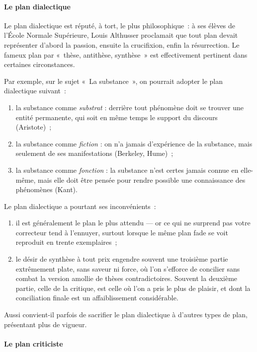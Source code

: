 \documentclass[a4paper]{article}
\begin{document}
\paragraph{Le plan dialectique}
\label{sec-2-4-2-1}


Le plan dialectique est réputé, à tort, le plus philosophique : à ses
élèves de l'École Normale Supérieure, Louis Althusser proclamait que
tout plan devait représenter d'abord la passion, ensuite la crucifixion,
enfin la résurrection. Le fameux plan par « thèse, antithèse, synthèse »
est effectivement pertinent dans certaines circonstances.

Par exemple, sur le sujet « La substance », on pourrait adopter le plan
dialectique suivant :

\begin{enumerate}
\item la substance comme \emph{substrat} : derrière tout phénomène doit se
   trouver une entité permanente, qui soit en même temps le support du
   discours (Aristote) ;
\item la substance comme \emph{fiction} : on n'a jamais d'expérience de la
   substance, mais seulement de ses manifestations (Berkeley, Hume) ;
\item la substance comme \emph{fonction} : la substance n'est certes jamais
   connue en elle-même, mais elle doit être pensée pour rendre possible
   une connaissance des phénomènes (Kant).
\end{enumerate}

Le plan dialectique a pourtant ses inconvénients :

\begin{enumerate}
\item il est généralement le plan le plus attendu --- or ce qui ne surprend
   pas votre correcteur tend à l'ennuyer, surtout lorsque le même plan
   fade se voit reproduit en trente exemplaires ;
\item le désir de synthèse à tout prix engendre souvent une troisième
   partie extrêmement plate, sans saveur ni force, où l'on s'efforce de
   concilier sans combat la version amollie de thèses contradictoires.
   Souvent la deuxième partie, celle de la critique, est celle où l'on a
   pris le plus de plaisir, et dont la conciliation finale est un
   affaiblissement considérable.
\end{enumerate}

Aussi convient-il parfois de sacrifier le plan dialectique à d'autres
types de plan, présentant plus de vigueur.
\paragraph{Le plan criticiste}
\label{sec-2-4-2-2}
\end{document}
